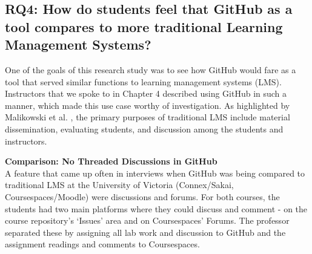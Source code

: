 



\subsection{RQ4: How do students feel that GitHub as a tool compares to more traditional Learning Management Systems?}
One of the goals of this research study was to see how GitHub would fare as a tool that served similar functions to learning management systems (LMS). Instructors that we spoke to in Chapter 4 described using GitHub in such a manner, which made this use case worthy of investigation. As highlighted by Malikowski et al. \cite{malikowski2007model}, the primary purposes of traditional LMS include material dissemination, evaluating students, and discussion among the students and instructors.

\textbf{Comparison: No Threaded Discussions in GitHub} \\
A feature that came up often in interviews when GitHub was being compared to traditional LMS at the University of Victoria (Connex/Sakai, Coursespaces/Moodle) were discussions and forums. For both courses, the students had two main platforms where they could discuss and comment - on the course repository's `Issues' area and on Coursespaces' Forums. The professor separated these by assigning all lab work and discussion to GitHub and the assignment readings and comments to Coursespaces.


